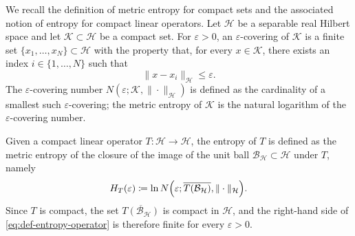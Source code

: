 \documentclass[a4paper,12pt]{article}
\let\originalleft\left
\let\originalright\right
\renewcommand{\left}{\mathopen{}\mathclose\bgroup\originalleft}
\renewcommand{\right}{\aftergroup\egroup\originalright}
\begin{document}
We recall the definition of metric entropy for compact sets and the associated notion of entropy for compact linear operators.
Let $\mathcal{H}$ be a separable real Hilbert space and let $\mathcal{K} \subset \mathcal{H}$ be a compact set.
For $\varepsilon > 0$, an {$\varepsilon$-covering} of $\mathcal{K}$ is a finite set
$\{x_1,\dots,x_N\} \subset \mathcal{H}$ with the property that, for every
$x \in \mathcal{K}$, there exists an index $i \in \{1,\dots,N\}$ such that
\[
\|x - x_i\|_{\mathcal{H}} \le \varepsilon .
\]
The {$\varepsilon$-covering number} $N(\varepsilon;\mathcal{K},\|\cdot\|_{\mathcal{H}})$ is defined as the cardinality of a smallest such $\varepsilon$-covering; the {metric entropy} of $\mathcal{K}$ is the natural logarithm of the $\varepsilon$-covering number.

Given a compact linear operator $T\colon \mathcal{H} \to \mathcal{H}$, the {entropy} of $T$ is defined as the metric entropy of the closure of the image of the unit ball $\mathcal{B}_{\mathcal{H}} \subset \mathcal{H}$ under $T$, namely
\begin{equation}
\label{eq:def-entropy-operator}
    H_T(\varepsilon)
    \coloneqq
    \ln N \left(\varepsilon; \overline{T(\mathcal{B}_{\mathcal{H}})}, \|\cdot\|_{\mathcal{H}}\right).
\end{equation}
Since $T$ is compact, the set $\overline{T(\mathcal{B}_{\mathcal{H}})}$ is compact in $\mathcal{H}$, and the right-hand side of \eqref{eq:def-entropy-operator} is therefore finite for every $\varepsilon>0$.
\end{document}
